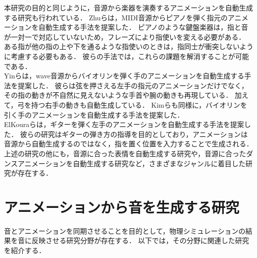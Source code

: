 %
\indent
本研究の目的と同じように，音源から楽器を演奏するアニメーションを自動生成する研究も行われている．
Zhuら\cite{piano}は，MIDI音源からピアノを弾く指元のアニメーションを自動生成する手法を提案した．
ピアノのような鍵盤楽器は，指と音が一対一で対応していないため，フレーズにより指使いを変える必要がある．
ある指が他の指の上や下を通るような指使いのときは，指同士が衝突しないように考慮する必要もある．
彼らの手法では，これらの課題を解消することが可能である．\\
\indent
Yinら\cite{violin}は，wave音源からバイオリンを弾く手のアニメーションを自動生成する手法を提案した．
彼らは弦を押さえる左手の指元のアニメーションだけでなく，その指の動きが不自然に見えないような手首や腕の動きも再現している．
加えて，弓を持つ右手の動きも自動生成している．
Kimら\cite{violin2}も同様に，バイオリンを引く手のアニメーションを自動生成する手法を提案した．\\
\indent
ElKouraら\cite{ElKoura}は，ギターを弾く左手のアニメーションを自動生成する手法を提案した．
彼らの研究はギターの弾き方の指導を目的としており，アニメーションは音源から自動生成するのではなく，指を置く位置を入力することで生成される．\\
%
\indent
上述の研究の他にも，音源に合った表情を自動生成する研究\cite{facial}\cite{DiPaola}\cite{morishima}や，音源に合ったダンスアニメーションを自動生成する研究\cite{dance2}\cite{dance1}など，さまざまなジャンルに着目した研究が存在する．

\section{アニメーションから音を生成する研究}\label{sec:generate_sound}
音とアニメーションを同期させることを目的として，物理シミュレーションの結果を音に反映させる研究分野が存在する．
以下では，その分野に関連した研究を紹介する．\\
%

